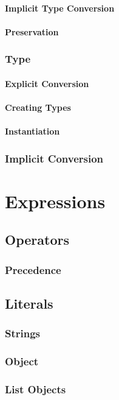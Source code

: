 \documentclass[12pt,letterpaper]{report}
\begin{document}
\subsubsection{Implicit Type Conversion}
\subsubsection{Preservation}
\subsection{Type}            
\subsubsection{Explicit Conversion}
\subsubsection{Creating Types}
\subsubsection{Instantiation}
\subsection{Implicit Conversion}
\chapter{Expressions}
\section{Operators}
\subsection{Precedence}
\section{Literals}
\subsection{Strings}
\subsection{Object}
\subsection{List Objects}
\end{document}
